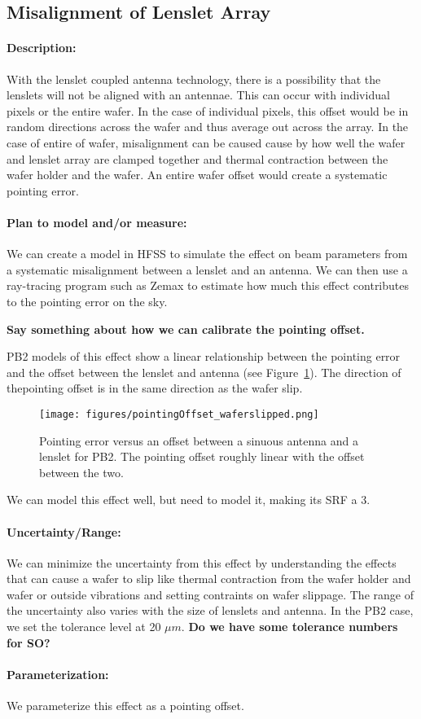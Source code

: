 \subsection{Misalignment of Lenslet Array}

\paragraph{Description:}
With the lenslet coupled antenna technology, there is a possibility that the lenslets will not be aligned with an antennae. This can occur with individual pixels or the entire wafer. In the case of individual pixels, this offset would be in random directions across the wafer and thus average out across the array. In the case of entire of wafer, misalignment can be caused cause by how well the wafer and lenslet array are clamped together and thermal contraction between the wafer holder and the wafer. An entire wafer offset would create a systematic pointing error.

\paragraph{Plan to model and/or measure:}
We can create a model in HFSS to simulate the effect on beam parameters from a systematic misalignment between a lenslet and an antenna. We can then use a ray-tracing program such as Zemax to estimate how much this effect contributes to the pointing error on the sky.

\textbf{Say something about how we can calibrate the pointing offset.}

PB2 models of this effect show a linear relationship between the pointing error and the offset between the lenslet and antenna (see Figure~\ref{poitingoffsetFromWaferslipped}). The direction of thepointing offset is in the same direction as the wafer slip. 
  
\begin{figure}
\centering
\texttt{[image: figures/pointingOffset\_waferslipped.png]}
\caption{Pointing error versus an offset between a sinuous antenna and a lenslet for PB2. The pointing offset roughly linear with the offset between the two.}
\label{poitingoffsetFromWaferslipped}
\end{figure}


We can model this effect well, but need to model it, making its SRF a 3.

\paragraph{Uncertainty/Range:}
We can minimize the uncertainty from this effect by understanding the effects that can cause a wafer to slip like thermal contraction from the wafer holder and wafer or outside vibrations and setting contraints on wafer slippage. The range of the uncertainty also varies with the size of lenslets and antenna. In the PB2 case, we set the tolerance level at 20 $\mu m$. \textbf{Do we have some tolerance numbers for SO?}

\paragraph{Parameterization:}
We parameterize this effect as a pointing offset.

